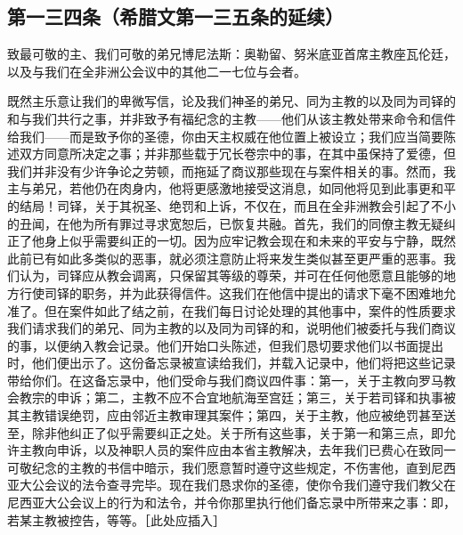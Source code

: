 \subsection{第一三四条（希腊文第一三五条的延续）}

\par

致最可敬的主、我们可敬的弟兄博尼法斯：奥勒留、努米底亚首席主教座瓦伦廷，以及与我们在全非洲公会议中的其他二一七位与会者。\par

既然主乐意让我们的卑微写信，论及我们神圣的弟兄、同为主教的以及同为司铎的和与我们共行之事，并非致予有福纪念的主教——他们从该主教处带来命令和信件给我们——而是致予你的圣德，你由天主权威在他位置上被设立；我们应当简要陈述双方同意所决定之事；并非那些载于冗长卷宗中的事，在其中虽保持了爱德，但我们并非没有少许争论之劳顿，而拖延了商议那些现在与案件相关的事。然而，我主与弟兄，若他仍在肉身内，他将更感激地接受这消息，如同他将见到此事更和平的结局！司铎，关于其祝圣、绝罚和上诉，不仅在，而且在全非洲教会引起了不小的丑闻，在他为所有罪过寻求宽恕后，已恢复共融。首先，我们的同僚主教无疑纠正了他身上似乎需要纠正的一切。因为应牢记教会现在和未来的平安与宁静，既然此前已有如此多类似的恶事，就必须注意防止将来发生类似甚至更严重的恶事。我们认为，司铎应从教会调离，只保留其等级的尊荣，并可在任何他愿意且能够的地方行使司铎的职务，并为此获得信件。这我们在他信中提出的请求下毫不困难地允准了。但在案件如此了结之前，在我们每日讨论处理的其他事中，案件的性质要求我们请求我们的弟兄、同为主教的以及同为司铎的和，说明他们被委托与我们商议的事，以便纳入教会记录。他们开始口头陈述，但我们恳切要求他们以书面提出时，他们便出示了。这份备忘录被宣读给我们，并载入记录中，他们将把这些记录带给你们。在这备忘录中，他们受命与我们商议四件事：第一，关于主教向罗马教会教宗的申诉；第二，主教不应不合宜地航海至宫廷；第三，关于若司铎和执事被其主教错误绝罚，应由邻近主教审理其案件；第四，关于主教，他应被绝罚甚至送至，除非他纠正了似乎需要纠正之处。关于所有这些事，关于第一和第三点，即允许主教向申诉，以及神职人员的案件应由本省主教解决，去年我们已费心在致同一可敬纪念的主教的书信中暗示，我们愿意暂时遵守这些规定，不伤害他，直到尼西亚大公会议的法令查寻完毕。现在我们恳求你的圣德，使你令我们遵守我们教父在尼西亚大公会议上的行为和法令，并令你那里执行他们备忘录中所带来之事：即，若某主教被控告，等等。［此处应插入］\par

